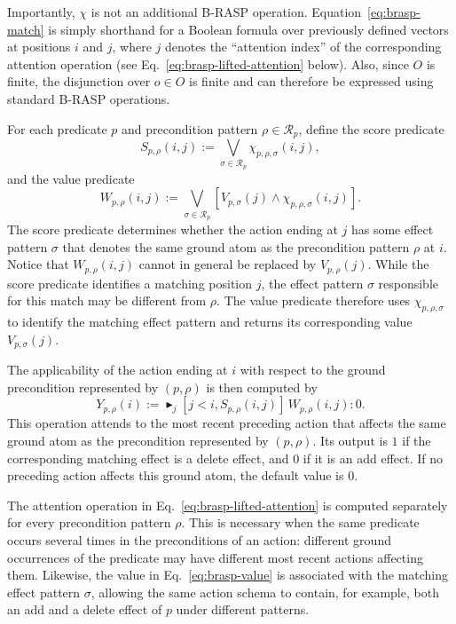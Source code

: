 Importantly, $\chi$ is not an additional B-RASP operation.
Equation~\ref{eq:brasp-match} is simply shorthand for a Boolean formula over
previously defined vectors at positions $i$ and $j$, where $j$ denotes the
``attention index'' of the corresponding attention operation
(see Eq.~\ref{eq:brasp-lifted-attention} below).
Also, since $O$ is finite,
the disjunction over $o\in O$ is finite and can therefore be expressed
using standard B-RASP operations.

For each predicate $p$ and precondition pattern
$\rho\in\mathcal{R}_p$, define the score predicate
\begin{equation}
S_{p,\rho}(i,j)
:=
\bigvee_{\sigma\in\mathcal{R}_p}
\chi_{p,\rho,\sigma}(i,j),
\label{eq:brasp-score}
\end{equation}
and the value predicate
\begin{equation}
W_{p,\rho}(i,j)
:=
\bigvee_{\sigma\in\mathcal{R}_p}
\left[
V_{p,\sigma}(j)
\land
\chi_{p,\rho,\sigma}(i,j)
\right].
\label{eq:brasp-value}
\end{equation}
The score predicate determines whether the action ending at $j$ has some
effect pattern $\sigma$ that denotes the same ground atom as the precondition
pattern $\rho$ at $i$. Notice that $W_{p,\rho}(i,j)$ cannot in general be
replaced by $V_{p,\rho}(j)$. While the score predicate identifies a matching position
$j$, the effect pattern $\sigma$ responsible for this match may be different from $\rho$. The value predicate therefore uses $\chi_{p,\rho,\sigma}$ to
identify the matching effect pattern and returns its corresponding value
$V_{p,\sigma}(j)$.

The applicability of the action ending at $i$ with respect to the ground
precondition represented by $(p,\rho)$ is then computed by
\begin{equation}
Y_{p,\rho}(i)
:=
\blacktriangleright_j
[j<i,S_{p,\rho}(i,j)]\,
W_{p,\rho}(i,j):0.
\label{eq:brasp-lifted-attention}
\end{equation}
This operation attends to the most recent preceding action that affects the
same ground atom as the precondition represented by $(p,\rho)$. Its output
is $1$ if the corresponding matching effect is a delete effect,
and $0$ if it is an add effect. If no preceding action affects this ground atom,
the default value is $0$.

The attention operation in
Eq.~\ref{eq:brasp-lifted-attention} is computed separately for every
precondition pattern $\rho$. This is necessary when the same predicate
occurs several times in the preconditions of an action: different ground
occurrences of the predicate may have different most recent actions affecting
them. Likewise, the value in Eq.~\ref{eq:brasp-value} is associated with the
matching effect pattern $\sigma$, allowing the same action schema to contain,
for example, both an add and a delete effect of $p$ under different patterns.

